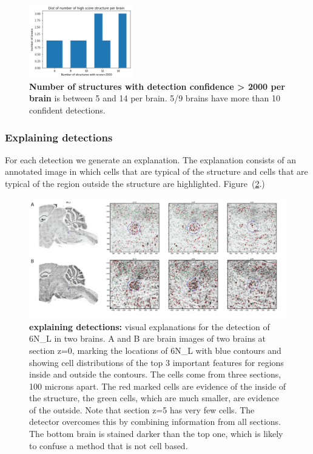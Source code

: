 \documentclass[11pt]{article}
\begin{document}
\begin{figure}[t]
  \includegraphics[width=0.4\textwidth]{figures/PerBrainStrongDetections.png}
  \caption{\label{fig:ConfidentStructureHist} {\bf Number of
      structures with detection confidence > 2000 per brain} is
    between 5 and 14 per brain. 5/9 brains have more than 10 confident detections.}
\end{figure}



\subsubsection{Explaining detections}
For each detection we generate an explanation. The explanation
consists of an annotated image in which cells that are typical of the
structure and cells that are typical of the region outside the
structure are highlighted. Figure~(\ref{fig:explaining}.)

\begin{figure}[t]
  \includegraphics[width=\textwidth]{figures/DetectionExplanation.png}
  \caption{\label{fig:explaining} {\bf explaining detections:} visual explanations for the
    detection of 6N\_L in two brains. A and B are brain images of two
    brains at section z=0, marking the locations of 6N\_L with blue
    contours and showing cell distributions of the top 3 important
    features for regions inside and outside the contours.  The cells
    come from three sections, 100 microns apart. The red marked cells
    are evidence of the inside of the structure, the green cells,
    which are much smaller, are evidence of the outside. Note that
    section z=5 has very few cells. The detector overcomes this by
    combining information from all sections.  The bottom brain is
    stained darker than the top one, which is likely to confuse a
    method that is not cell based.}
  \end{figure}
\end{document}
